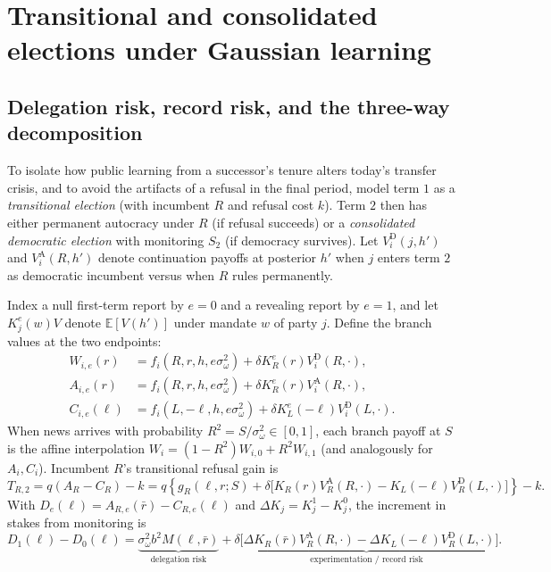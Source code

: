 \documentclass[11pt,letterpaper]{article}
\newcommand{\E}{\mathbb E}
\newcommand{\D}{\mathrm D}
\newcommand{\A}{\mathrm A}
\begin{document}
\section{Transitional and consolidated elections under Gaussian learning}\label{sec:two}

\subsection{Delegation risk, record risk, and the three-way decomposition}

To isolate how public learning from a successor's tenure alters today's transfer crisis, and to avoid the artifacts of a refusal in the final period, model term $1$ as a \emph{transitional election} (with incumbent $R$ and refusal cost $k$). Term $2$ then has either permanent autocracy under $R$ (if refusal succeeds) or a \emph{consolidated democratic election} with monitoring $S_2$ (if democracy survives). Let $V_i^\D(j,h')$ and $V_i^\A(R,h')$ denote continuation payoffs at posterior $h'$ when $j$ enters term $2$ as democratic incumbent versus when $R$ rules permanently.

Index a null first-term report by $e=0$ and a revealing report by $e=1$, and let $K_j^e(w)V$ denote $\E[V(h')]$ under mandate $w$ of party $j$. Define the branch values at the two endpoints:
\begin{align}
 W_{i,e}(r)&=f_i(R,r,h,e\sigma_\omega^2)+\delta K_R^e(r)V_i^\D(R,\cdot),\nonumber\\
 A_{i,e}(r)&=f_i(R,r,h,e\sigma_\omega^2)+\delta K_R^e(r)V_i^\A(R,\cdot),\nonumber\\
 C_{i,e}(\ell)&=f_i(L,-\ell,h,e\sigma_\omega^2)+\delta K_L^e(-\ell)V_i^\D(L,\cdot).
 \label{eq:endpointvalues}
\end{align}
When news arrives with probability $R^2=S/\sigma_\omega^2\in[0,1]$, each branch payoff at $S$ is the affine interpolation $W_i=(1-R^2)W_{i,0}+R^2 W_{i,1}$ (and analogously for $A_i,C_i$). Incumbent $R$'s transitional refusal gain is
\begin{equation}
 T_{R,2}=q(A_R-C_R)-k
 =q\left\{g_R(\ell,r;S)+\delta
       \big[K_R(r)V_R^\A(R,\cdot)-K_L(-\ell)V_R^\D(L,\cdot)\big]\right\}-k .
 \label{eq:twogain}
\end{equation}
With $D_e(\ell)=A_{R,e}(\bar r)-C_{R,e}(\ell)$ and $\Delta K_j=K_j^1-K_j^0$, the increment in stakes from monitoring is
\begin{equation}
 D_1(\ell)-D_0(\ell)=
 \underbrace{\sigma_\omega^2 b^2 M(\ell,\bar r)}_{\text{delegation risk}}
 +\underbrace{\delta\big[\Delta K_R(\bar r) V_R^\A(R,\cdot)-\Delta K_L(-\ell) V_R^\D(L,\cdot)\big]}_{\text{experimentation / record risk}}.
 \label{eq:twodecomposition}
\end{equation}
\end{document}
